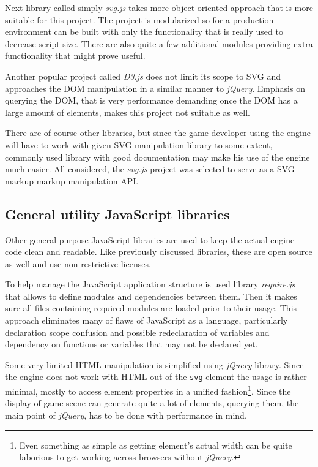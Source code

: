 \documentclass[11pt,oneside, final]{fithesis2}
\begin{document}
Next library called simply \emph{svg.js} takes more object oriented approach\cite{svgjs} that is more suitable for this project. The project is modularized so for a production environment can be built with only the functionality that is really used to decrease script size. There are also quite a few additional modules providing extra functionality that might prove useful.

Another popular project called \emph{D3.js} does not limit its scope to SVG and approaches the DOM manipulation in a similar manner to \emph{jQuery}\cite{d3js}. Emphasis on querying the DOM, that is very performance demanding once the DOM has a large amount of elements, makes this project not suitable as well.

There are of course other libraries, but since the game developer using the engine will have to work with given SVG manipulation library to some extent, commonly used library with good documentation may make his use of the engine much easier. All considered, the \emph{svg.js} project was selected to serve as a SVG markup markup manipulation API.

\subsection{General utility JavaScript libraries}
Other general purpose JavaScript libraries are used to keep the actual engine code clean and readable. Like previously discussed libraries, these are open source as well and use non-restrictive licenses.

To help manage the JavaScript application structure is used library \emph{require.js} that allows to define modules and dependencies between them. Then it makes sure all files containing required modules are loaded prior to their usage. \cite{requirejs} This approach eliminates many of flaws of JavaScript as a language, particularly declaration scope confusion and possible redeclaration of variables and dependency on functions or variables that may not be declared yet.

Some very limited HTML manipulation is simplified using \emph{jQuery} library. Since the engine does not work with HTML out of the \texttt{svg} element the usage is rather minimal, mostly to access element properties in a unified fashion\footnote{Even something as simple as getting element's actual width can be quite laborious to get working across browsers without \emph{jQuery}.}. Since the display of game scene can generate quite a lot of elements, querying them, the main point of \emph{jQuery}\cite{jquery}, has to be done with performance in mind.
\end{document}
